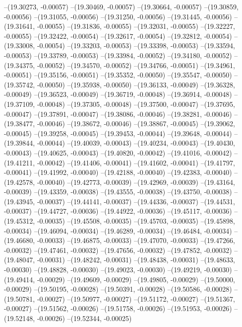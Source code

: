 --(19.30273, -0.00057)
--(19.30469, -0.00057)
--(19.30664, -0.00057)
--(19.30859, -0.00056)
--(19.31055, -0.00056)
--(19.31250, -0.00056)
--(19.31445, -0.00056)
--(19.31641, -0.00055)
--(19.31836, -0.00055)
--(19.32031, -0.00055)
--(19.32227, -0.00055)
--(19.32422, -0.00054)
--(19.32617, -0.00054)
--(19.32812, -0.00054)
--(19.33008, -0.00054)
--(19.33203, -0.00053)
--(19.33398, -0.00053)
--(19.33594, -0.00053)
--(19.33789, -0.00053)
--(19.33984, -0.00052)
--(19.34180, -0.00052)
--(19.34375, -0.00052)
--(19.34570, -0.00052)
--(19.34766, -0.00051)
--(19.34961, -0.00051)
--(19.35156, -0.00051)
--(19.35352, -0.00050)
--(19.35547, -0.00050)
--(19.35742, -0.00050)
--(19.35938, -0.00050)
--(19.36133, -0.00049)
--(19.36328, -0.00049)
--(19.36523, -0.00049)
--(19.36719, -0.00048)
--(19.36914, -0.00048)
--(19.37109, -0.00048)
--(19.37305, -0.00048)
--(19.37500, -0.00047)
--(19.37695, -0.00047)
--(19.37891, -0.00047)
--(19.38086, -0.00046)
--(19.38281, -0.00046)
--(19.38477, -0.00046)
--(19.38672, -0.00046)
--(19.38867, -0.00045)
--(19.39062, -0.00045)
--(19.39258, -0.00045)
--(19.39453, -0.00044)
--(19.39648, -0.00044)
--(19.39844, -0.00044)
--(19.40039, -0.00043)
--(19.40234, -0.00043)
--(19.40430, -0.00043)
--(19.40625, -0.00043)
--(19.40820, -0.00042)
--(19.41016, -0.00042)
--(19.41211, -0.00042)
--(19.41406, -0.00041)
--(19.41602, -0.00041)
--(19.41797, -0.00041)
--(19.41992, -0.00040)
--(19.42188, -0.00040)
--(19.42383, -0.00040)
--(19.42578, -0.00040)
--(19.42773, -0.00039)
--(19.42969, -0.00039)
--(19.43164, -0.00039)
--(19.43359, -0.00038)
--(19.43555, -0.00038)
--(19.43750, -0.00038)
--(19.43945, -0.00037)
--(19.44141, -0.00037)
--(19.44336, -0.00037)
--(19.44531, -0.00037)
--(19.44727, -0.00036)
--(19.44922, -0.00036)
--(19.45117, -0.00036)
--(19.45312, -0.00035)
--(19.45508, -0.00035)
--(19.45703, -0.00035)
--(19.45898, -0.00034)
--(19.46094, -0.00034)
--(19.46289, -0.00034)
--(19.46484, -0.00034)
--(19.46680, -0.00033)
--(19.46875, -0.00033)
--(19.47070, -0.00033)
--(19.47266, -0.00032)
--(19.47461, -0.00032)
--(19.47656, -0.00032)
--(19.47852, -0.00032)
--(19.48047, -0.00031)
--(19.48242, -0.00031)
--(19.48438, -0.00031)
--(19.48633, -0.00030)
--(19.48828, -0.00030)
--(19.49023, -0.00030)
--(19.49219, -0.00030)
--(19.49414, -0.00029)
--(19.49609, -0.00029)
--(19.49805, -0.00029)
--(19.50000, -0.00029)
--(19.50195, -0.00028)
--(19.50391, -0.00028)
--(19.50586, -0.00028)
--(19.50781, -0.00027)
--(19.50977, -0.00027)
--(19.51172, -0.00027)
--(19.51367, -0.00027)
--(19.51562, -0.00026)
--(19.51758, -0.00026)
--(19.51953, -0.00026)
--(19.52148, -0.00026)
--(19.52344, -0.00025)
